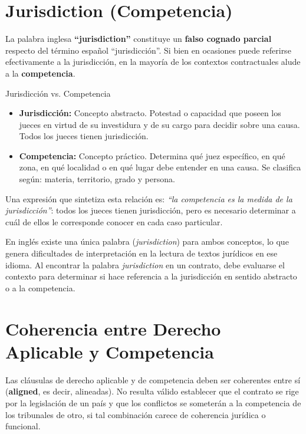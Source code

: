 \documentclass[12pt,oneside]{book}
\begin{document}
\section{Jurisdiction (Competencia)}

La palabra inglesa \textbf{``jurisdiction''} constituye un \textbf{falso
cognado parcial} respecto del término español ``jurisdicción''. Si bien en
ocasiones puede referirse efectivamente a la jurisdicción, en la mayoría de
los contextos contractuales alude a la \textbf{competencia}.

\begin{definition}{Jurisdicción vs. Competencia}
\begin{itemize}
    \item \textbf{Jurisdicción:} Concepto abstracto. Potestad o capacidad
    que poseen los jueces en virtud de su investidura y de su cargo para
    decidir sobre una causa. Todos los jueces tienen jurisdicción.
    \item \textbf{Competencia:} Concepto práctico. Determina qué juez
    específico, en qué zona, en qué localidad o en qué lugar debe entender
    en una causa. Se clasifica según: materia, territorio, grado y persona.
\end{itemize}
\end{definition}

Una expresión que sintetiza esta relación es: \textit{``la competencia es
la medida de la jurisdicción''}: todos los jueces tienen jurisdicción,
pero es necesario determinar a cuál de ellos le corresponde conocer en
cada caso particular.

En inglés existe una única palabra (\textit{jurisdiction}) para ambos
conceptos, lo que genera dificultades de interpretación en la lectura de
textos jurídicos en ese idioma. Al encontrar la palabra
\textit{jurisdiction} en un contrato, debe evaluarse el contexto para
determinar si hace referencia a la jurisdicción en sentido abstracto o a
la competencia.

\section{Coherencia entre Derecho Aplicable y Competencia}

Las cláusulas de derecho aplicable y de competencia deben ser coherentes
entre sí (\textbf{aligned}, es decir, alineadas). No resulta válido
establecer que el contrato se rige por la legislación de un país y que los
conflictos se someterán a la competencia de los tribunales de otro, si tal
combinación carece de coherencia jurídica o funcional.
\end{document}
